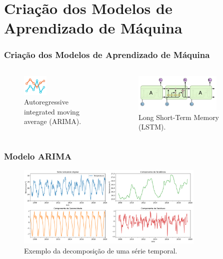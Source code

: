 \documentclass[aspectratio=169]{beamer}
\begin{document}

\section{Criação dos Modelos de Aprendizado de Máquina}

\begin{frame}
\frametitle{Criação dos Modelos de Aprendizado de Máquina}

\begin{columns}

\begin{figure}[H]
\centering
\caption{Autoregressive integrated moving average (ARIMA).}
\includegraphics[width=0.35\textwidth]{figuras/arima.png}
\end{figure}


\begin{figure}[H]
\centering
\caption{Long Short-Term Memory (LSTM).}
\includegraphics[width=0.8\textwidth]{figuras/lstm.png}
\end{figure}

\end{columns}

\end{frame}


\begin{frame}
\frametitle{Modelo ARIMA}

\begin{figure}[H]
\centering
\caption{Exemplo da decomposição de uma série temporal.}
\includegraphics[width=0.8\textwidth]{figuras/decomposicao_712f3e11658051636f09732a60fb3c1b.png}
\end{figure}

\end{frame}
\end{document}
